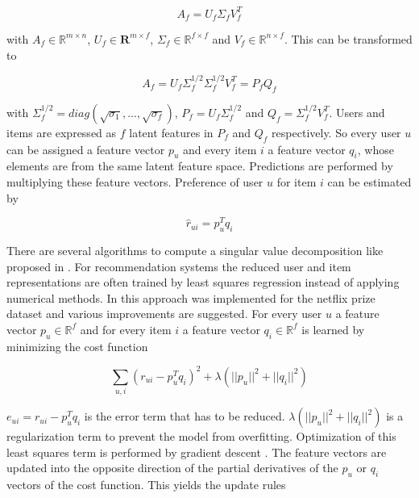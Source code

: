 \documentclass[10pt]{reportMaster}
\begin{document}
\begin{equation}
	A_f = U_f \Sigma_f V_f^T
\end{equation}

with $A_f \in \mathds{R}^{m \times n}$, $U_f \in \mathbf{R}^{m \times f}$, $\Sigma_f \in \mathds{R}^{f \times f}$ and $V_f \in \mathds{R}^{n \times f}$.
This can be transformed to 

\begin{equation}
	A_f = U_f \Sigma_f^{1/2} \Sigma_f^{1/2} V_f^T = P_f Q_f
\end{equation}

with $\Sigma_f^{1/2} = diag(\sqrt{\sigma_1}, ..., \sqrt{\sigma_f})$, $P_f = U_f \Sigma_f^{1/2}$ and $Q_f = \Sigma_f^{1/2} V_f^T$.
Users and items are expressed as $f$ latent features in $P_f$ and $Q_f$ respectively.
So every user $u$ can be assigned a feature vector $p_u$ and every item $i$ a feature vector $q_i$, whose elements are from the same latent feature space.
Predictions are performed by multiplying these feature vectors.
Preference of user $u$ for item $i$ can be estimated by 

\begin{equation}
	\label{eq:linRegPrediction}
	\hat{r}_{ui} = p_u^T q_i
\end{equation}


There are several algorithms to compute a singular value decomposition like proposed in \cite{svdGolubSolution}.
For recommendation systems the reduced user and item representations are often trained by least squares regression instead of applying numerical methods.
In \cite{matrixFactorizationDifRegParam} this approach was implemented for the netflix prize dataset and various improvements are suggested.
For every user $u$ a feature vector $p_u \in \mathds{R}^f$ and for every item $i$ a feature vector $q_i \in \mathds{R}^f$ is learned by minimizing the cost function 

\begin{equation}
	\sum_{u, i}{(r_{ui} - p_u^T q_i)^2 + \lambda (||p_u||^2 + ||q_i||^2)}
\end{equation}

$e_{ui} = r_{ui} - p_u^T q_i$ is the error term that has to be reduced.
$\lambda (||p_u||^2 + ||q_i||^2)$ is a regularization term to prevent the model from overfitting.
Optimization of this least squares term is performed by gradient descent \cite{ngRegressionLectureNotes}.
The feature vectors are updated into the opposite direction of the partial derivatives of the $p_u$ or $q_i$ vectors of the cost function.
This yields the update rules
\end{document}
